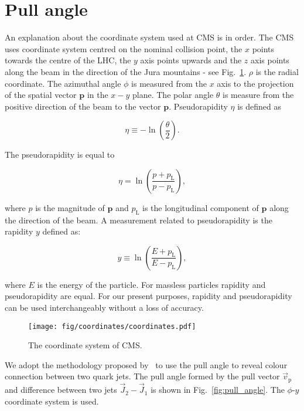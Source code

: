 \section{Pull angle}

An explanation about the coordinate system used at CMS is in order. The CMS uses coordinate system centred on the nominal collision point, the $x$ points towards the centre of the LHC, the $y$ axis points upwards and the $z$ axis points along the beam in the direction of the Jura mountains - see Fig.~\ref{fig:CMScoordinates}. $\rho$ is the radial coordinate. The azimuthal angle $\phi$ is measured from the $x$ axis to the projection of the spatial vector $\textbf{p}$ in the $x-y$ plane. The polar angle $\theta$ is measure from the positive direction of the beam to the vector $\textbf{p}$. Pseudorapidity $\eta$ is defined as

\begin{equation}
\eta\equiv-\ln\left(\frac{\theta}{2}\right).
\end{equation}

The pseudorapidity is equal to

\begin{equation}
\eta=\ln\left(\frac{p+p_{\text{L}}}{p-p_{\text{L}}}\right),
\end{equation}

\noindent where $p$ is the magnitude of $\textbf{p}$ and $p_{\text{L}}$ is the longitudinal component of $\textbf{p}$ along the direction of the beam. A measurement related to pseudorapidity is the rapidity $y$ defined as:

\begin{equation}
y\equiv\ln\left(\frac{E+p_{\text{L}}}{E-p_{\text{L}}}\right),
\end{equation}

\noindent where $E$ is the energy of the particle. For massless particles rapidity and pseudorapidity are equal. For our present purposes, rapidity and pseudorapidity can be used interchangeably without a loss of accuracy.

\begin{figure}[hptb]
  \centering
  \texttt{[image: fig/coordinates/coordinates.pdf]}
  \caption{The coordinate system of CMS.}
  \label{fig:CMScoordinates}
\end{figure}

We adopt the methodology proposed by~\cite{Gallicchio:2010sw} to use the pull angle to reveal colour connection between two quark jets. The pull angle \pullangle  formed by the pull vector $\vec{v}_{\text{p}}$ and difference between two jets $\vec{J}_{2}-\vec{J}_{1}$ is shown in Fig.~\ref{fig:pull_angle}. The $\phi$-$y$ coordinate system is used. 

